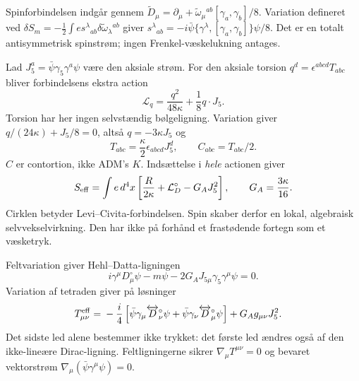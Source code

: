 \documentclass[11pt,a4paper]{article}
\begin{document}
Spinforbindelsen indgår gennem
$\widetilde D_\mu=\partial_\mu+\widetilde\omega_\mu{}^{ab}[\gamma_a,\gamma_b]/8$.
Variation defineret ved $\delta S_m=-\frac12\int e s^\lambda{}_{ab}\delta\widetilde\omega_\lambda{}^{ab}$ giver
$s^\lambda{}_{ab}=-i\bar\psi\{\gamma^\lambda,[\gamma_a,\gamma_b]\}\psi/8$.
Det er en totalt antisymmetrisk spinstrøm; ingen Frenkel-væskelukning antages.

Lad $J_5^a=\bar\psi\gamma_5\gamma^a\psi$ være den aksiale strøm. For den aksiale torsion $q^d=\epsilon^{abcd}T_{abc}$ bliver forbindelsens ekstra action
\begin{equation}
 \mathcal L_q=\frac{q^2}{48\kappa}+\frac18q\cdot J_5.
\end{equation}
Torsion har her ingen selvstændig bølgeligning. Variation giver
$q/(24\kappa)+J_5/8=0$, altså $q=-3\kappa J_5$ og
\begin{equation}
 T_{abc}=\frac\kappa2\epsilon_{abcd}J_5^d,\qquad
 C_{abc}=T_{abc}/2.
\end{equation}
$C$ er contortion, ikke ADM's $K$. Indsættelse i \emph{hele} actionen giver
\begin{equation}
 S_{\rm eff}=\int e\,d^4x\left[\frac R{2\kappa}+\mathcal L_D^\circ-G_AJ_5^2\right],
 \qquad G_A=\frac{3\kappa}{16}.
\end{equation}
Cirklen betyder Levi--Civita-forbindelsen. Spin skaber derfor en lokal, algebraisk selvvekselvirkning. Den har ikke på forhånd et frastødende fortegn som et væsketryk.

Feltvariation giver Hehl--Datta-ligningen
\begin{equation}
 i\gamma^\mu D^\circ_\mu\psi-m\psi
 -2G_AJ_{5\mu}\gamma_5\gamma^\mu\psi=0.
\end{equation}
Variation af tetraden giver på løsninger
\begin{align}
 T_{\mu\nu}^{\rm eff}={}&-\frac i4\left[
 \bar\psi\gamma_\mu\overleftrightarrow D^\circ_\nu\psi+
 \bar\psi\gamma_\nu\overleftrightarrow D^\circ_\mu\psi\right]
 +G_Ag_{\mu\nu}J_5^2.
\end{align}
Det sidste led alene bestemmer ikke trykket: det første led ændres også af den ikke-lineære Dirac-ligning. Feltligningerne sikrer $\nabla_\mu T^{\mu\nu}=0$ og bevaret vektorstrøm $\nabla_\mu(\bar\psi\gamma^\mu\psi)=0$.
\end{document}
